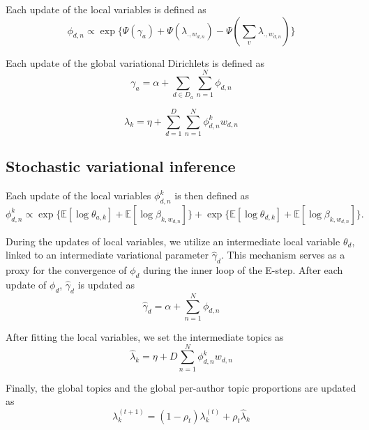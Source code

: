 Each update of the local variables is defined as
\begin{equation}
\phi_{d,n} \propto \exp \{ \Psi(\gamma_a) + \Psi(\lambda_{.,w_{d,n}}) - \Psi(\sum_{v}{\lambda_{.,w_{d,n}}}) \}
\end{equation}

Each update of the global variational Dirichlets is defined as
\begin{equation}
\gamma_a = \alpha + \sum_{d \in D_a}{\sum_{n=1}^{N}{\phi_{d,n}}}
\end{equation}

\begin{equation}
\lambda_k = \eta + \sum_{d=1}^{D}{\sum_{n=1}^{N}{\phi^k_{d,n}w_{d,n}}}
\end{equation}



\subsection{Stochastic variational inference}


Each update of the local variables $\phi^k_{d,n}$ is then defined as
\begin{equation}
\phi^k_{d,n} \propto \exp \{ \mathbb{E}[\log \theta_{a,k}] + \mathbb{E}[\log \beta_{k,w_{d,n}}] \} + \exp \{ \mathbb{E}[\log \theta_{d,k}] + \mathbb{E}[\log \beta_{k,w_{d,n}}] \}.
\end{equation}

During the updates of local variables, we utilize an intermediate local variable $\theta_{d}$, linked to an intermediate variational parameter $\hat{\gamma}_d$. This mechanism serves as a proxy for the convergence of $\phi_{d}$ during the inner loop of the E-step. After each update of $\phi_{d}$, $\hat{\gamma}_d$ is updated as
\begin{equation}
\hat{\gamma}_d = \alpha + \sum_{n=1}^{N}{\phi_{d,n}}
\end{equation}

After fitting the local variables, we set the intermediate topics as
\begin{equation}
\hat{\lambda}_k = \eta + D \sum_{n=1}^{N}{\phi^k_{d,n}w_{d,n}}
\end{equation}

Finally, the global topics and the global per-author topic proportions are updated as
\begin{equation}
\lambda^{(t+1)}_k = (1 - \rho_t) \lambda^{(t)}_k + \rho_t \hat{\lambda}_k
\end{equation}

